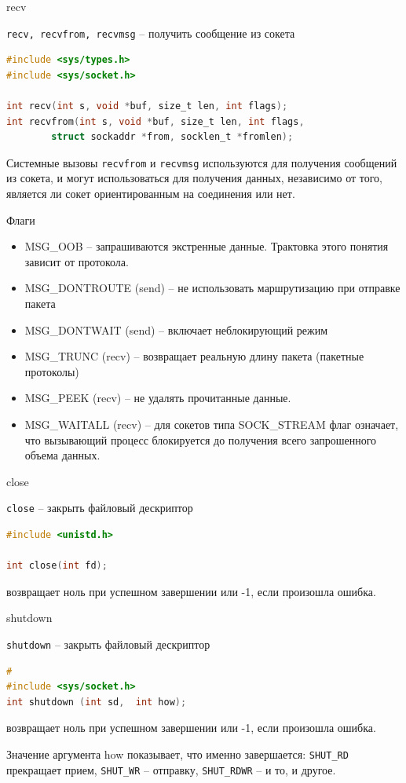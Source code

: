 \begin{frame}[fragile]{recv}

{\tt recv,  recvfrom,  recvmsg} -- получить сообщение из сокета
\begin{lstlisting}[language=C]
#include <sys/types.h>
#include <sys/socket.h>

int recv(int s, void *buf, size_t len, int flags);
int recvfrom(int s, void *buf, size_t len, int flags,
		struct sockaddr *from, socklen_t *fromlen);
\end{lstlisting}
Системные вызовы {\tt recvfrom} и {\tt recvmsg} используются для получения сообщений из  сокета, и  могут
использоваться  для получения данных,  независимо от того,  является ли сокет ориентированным на
соединения или нет.
\end{frame}

\begin{frame}{Флаги}
	\begin{itemize}
	\item MSG\_OOB -- запрашиваются экстренные данные. Трактовка этого понятия зависит от протокола.
	\item MSG\_DONTROUTE (send) -- не использовать  маршрутизацию  при  отправке пакета
	\item MSG\_DONTWAIT (send) -- включает неблокирующий режим
	\item MSG\_TRUNC (recv) -- возвращает реальную длину пакета (пакетные протоколы) 
	\item MSG\_PEEK (recv) -- не удалять прочитанные данные.
	\item MSG\_WAITALL (recv) -- для сокетов типа SOCK\_STREAM флаг означает,  что вызывающий процесс блокируется до получения всего запрошенного объема данных.
	\end{itemize}
\end{frame}

\begin{frame}[fragile]{close}

{\tt close} -- закрыть файловый дескриптор
\begin{lstlisting}[language=C]
#include <unistd.h>

int close(int fd);
\end{lstlisting}
возвращает ноль при успешном завершении или -1,  если произошла ошибка.
\end{frame}

\begin{frame}[fragile]{shutdown}

{\tt shutdown} -- закрыть файловый дескриптор
\begin{lstlisting}[language=C]
#
#include <sys/socket.h>
int shutdown (int sd,  int how);
\end{lstlisting}
возвращает ноль при успешном завершении или -1,  если произошла ошибка.

Значение аргумента how показывает,  что именно завершается: {\tt SHUT\_RD} прекращает прием, {\tt SHUT\_WR} -- отправку, {\tt SHUT\_RDWR} -- и то, и другое.
\end{frame}

